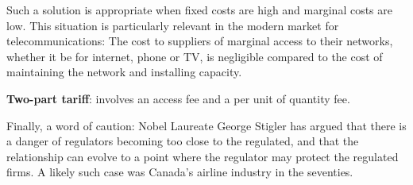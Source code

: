 Such a solution is appropriate when fixed costs are high and marginal costs
are low. This situation is particularly relevant in the modern market for
telecommunications: The cost to suppliers of marginal access to their
networks, whether it be for internet, phone or TV, is negligible compared to
the cost of maintaining the network and installing capacity.

\begin{DefBox}
	\textbf{Two-part tariff}: involves an access fee and a per unit of quantity fee.
\end{DefBox}

Finally, a word of caution: Nobel Laureate George Stigler has argued that
there is a danger of regulators becoming too close to the regulated, and
that the relationship can evolve to a point where the regulator may protect
the regulated firms. A likely such case was Canada's airline industry in the
seventies.
